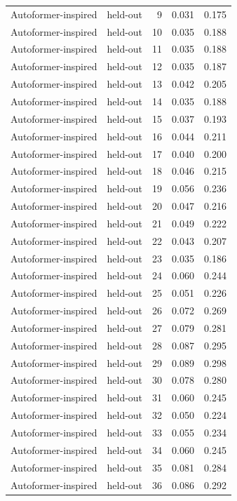 \begin{tabular}{llrrr}
Autoformer-inspired & held-out & 9 & 0.031 & 0.175 \\
Autoformer-inspired & held-out & 10 & 0.035 & 0.188 \\
Autoformer-inspired & held-out & 11 & 0.035 & 0.188 \\
Autoformer-inspired & held-out & 12 & 0.035 & 0.187 \\
Autoformer-inspired & held-out & 13 & 0.042 & 0.205 \\
Autoformer-inspired & held-out & 14 & 0.035 & 0.188 \\
Autoformer-inspired & held-out & 15 & 0.037 & 0.193 \\
Autoformer-inspired & held-out & 16 & 0.044 & 0.211 \\
Autoformer-inspired & held-out & 17 & 0.040 & 0.200 \\
Autoformer-inspired & held-out & 18 & 0.046 & 0.215 \\
Autoformer-inspired & held-out & 19 & 0.056 & 0.236 \\
Autoformer-inspired & held-out & 20 & 0.047 & 0.216 \\
Autoformer-inspired & held-out & 21 & 0.049 & 0.222 \\
Autoformer-inspired & held-out & 22 & 0.043 & 0.207 \\
Autoformer-inspired & held-out & 23 & 0.035 & 0.186 \\
Autoformer-inspired & held-out & 24 & 0.060 & 0.244 \\
Autoformer-inspired & held-out & 25 & 0.051 & 0.226 \\
Autoformer-inspired & held-out & 26 & 0.072 & 0.269 \\
Autoformer-inspired & held-out & 27 & 0.079 & 0.281 \\
Autoformer-inspired & held-out & 28 & 0.087 & 0.295 \\
Autoformer-inspired & held-out & 29 & 0.089 & 0.298 \\
Autoformer-inspired & held-out & 30 & 0.078 & 0.280 \\
Autoformer-inspired & held-out & 31 & 0.060 & 0.245 \\
Autoformer-inspired & held-out & 32 & 0.050 & 0.224 \\
Autoformer-inspired & held-out & 33 & 0.055 & 0.234 \\
Autoformer-inspired & held-out & 34 & 0.060 & 0.245 \\
Autoformer-inspired & held-out & 35 & 0.081 & 0.284 \\
Autoformer-inspired & held-out & 36 & 0.086 & 0.292 \\

\end{tabular}
